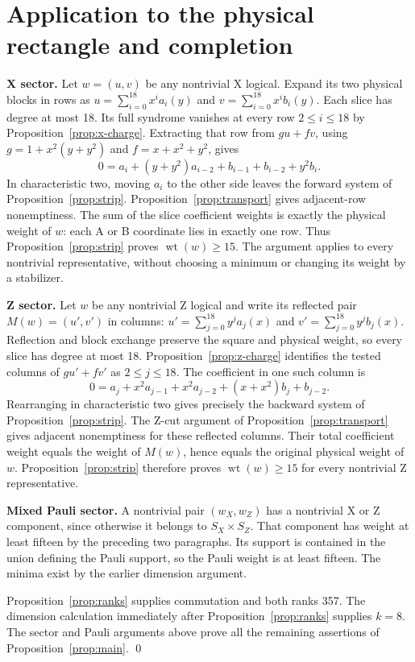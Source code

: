 \documentclass{article}
\DeclareMathOperator{\wt}{wt}
\begin{document}
\section{Application to the physical rectangle and completion}\label{sec:application}

\textbf{X sector.} Let \(w=(u,v)\) be any nontrivial X logical. Expand its two
physical blocks in rows as
\(u=\sum_{i=0}^{18}x^ia_i(y)\) and \(v=\sum_{i=0}^{18}x^ib_i(y)\).
Each slice has degree at most 18. Its full syndrome vanishes at every
row \(2\le i\le 18\) by Proposition~\ref{prop:x-charge}. Extracting that row from
\(gu+fv\), using \(g=1+x^2(y+y^2)\) and \(f=x+x^2+y^2\), gives
\begin{equation}
  0=a_i+(y+y^2)a_{i-2}+b_{i-1}+b_{i-2}+y^2b_i.
\end{equation}
In characteristic two, moving \(a_i\) to the other side leaves the forward
system of Proposition~\ref{prop:strip}. Proposition~\ref{prop:transport} gives
adjacent-row nonemptiness. The sum of
the slice coefficient weights is exactly the physical weight of \(w\):
each A or B coordinate lies in exactly one row. Thus Proposition~\ref{prop:strip}
proves \(\wt(w)\ge 15\). The argument applies to every nontrivial
representative, without choosing a minimum or changing its weight by a
stabilizer.

\textbf{Z sector.} Let \(w\) be any nontrivial Z logical and write its reflected
pair \(M(w)=(u',v')\) in columns:
\(u'=\sum_{j=0}^{18}y^ja_j(x)\) and \(v'=\sum_{j=0}^{18}y^jb_j(x)\).
Reflection and block exchange preserve the square and physical weight,
so every slice has degree at most 18. Proposition~\ref{prop:z-charge} identifies the
tested columns of \(gu'+fv'\) as \(2\le j\le 18\). The coefficient in one such
column is
\begin{equation}
  0=a_j+x^2a_{j-1}+x^2a_{j-2}+(x+x^2)b_j+b_{j-2}.
\end{equation}
Rearranging in characteristic two gives precisely the backward system of
Proposition~\ref{prop:strip}. The Z-cut argument of Proposition~\ref{prop:transport}
gives adjacent nonemptiness for these reflected columns. Their total
coefficient weight equals the weight of \(M(w)\), hence equals the original
physical weight of \(w\). Proposition~\ref{prop:strip} therefore proves
\(\wt(w)\ge 15\) for every nontrivial Z representative.

\textbf{Mixed Pauli sector.} A nontrivial pair \((w_X,w_Z)\) has a nontrivial X
or Z component, since otherwise it belongs to \(S_X\times S_Z\). That component
has weight at least fifteen by the preceding two paragraphs. Its support
is contained in the union defining the Pauli support, so the Pauli weight
is at least fifteen. The minima exist by the earlier dimension argument.

Proposition~\ref{prop:ranks} supplies commutation and both ranks 357. The dimension
calculation immediately after Proposition~\ref{prop:ranks} supplies \(k=8\). The
sector and Pauli arguments above prove all the remaining assertions of
Proposition~\ref{prop:main}. \qed
\end{document}
